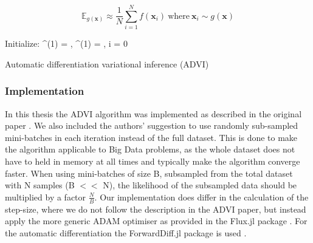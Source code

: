 \begin{equation}
    \label{eq:advi-mc}
    \mathbb{E}_{g(\bm{x})} \approx \frac{1}{N} \sum^N_{i=1} f(\bm{x}_i) \: \mathrm{where} \: \bm{x}_i \sim g(\bm{x})
\end{equation}

\begin{algorithm}
    \label{alg:advi}
    Initialize: \bm{\mu}^{(1)} = , \; \bm{\omega}^{(1)} = , \; i = 0 \\
    \caption{Automatic differentiation variational inference (ADVI)}
\end{algorithm}


\subsubsection{Implementation}
In this thesis the ADVI algorithm was implemented as described in the original paper \parencite{ADVI}. We also included the authors' suggestion to use randomly sub-sampled mini-batches in each iteration instead of the full dataset. This is done to make the algorithm applicable to Big Data problems, as the whole dataset does not have to held in memory at all times and typically make the algorithm converge faster. 
When using mini-batches of size B, subsampled from the total dataset with N samples (B $<<$ N), the likelihood of the subsampled data should be multiplied by a factor $\frac{N}{B}$.
Our implementation does differ in the calculation of the step-size, where we do not follow the description in the ADVI paper, but instead apply the more generic ADAM optimiser \parencite{ADAM} as provided in the Flux.jl package \parencite{Flux}. For the automatic differentiation the ForwardDiff.jl package is used \parencite{forwarddiff}.

